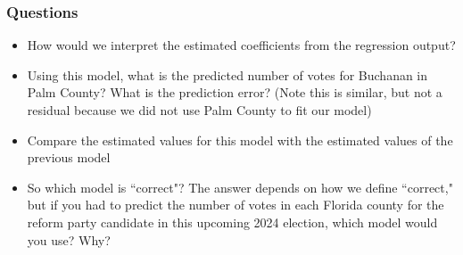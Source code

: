 \documentclass{article}\usepackage[]{graphicx}\usepackage[]{color}
\begin{document}
\subsubsection*{Questions}
\begin{itemize}
\item How would we interpret the estimated coefficients from the regression output? 
\item Using this model, what is the predicted number of votes for Buchanan in Palm County? What is the prediction error? (Note this is similar, but not a residual because we did not use Palm County to fit our model)
\item Compare the estimated values for this model with the estimated values of the previous model
\item So which model is ``correct"? The answer depends on how we define ``correct," but if you had to predict the number of votes in each Florida county for the reform party candidate in this upcoming 2024 election, which model would you use? Why?
\end{itemize}
\end{document}
